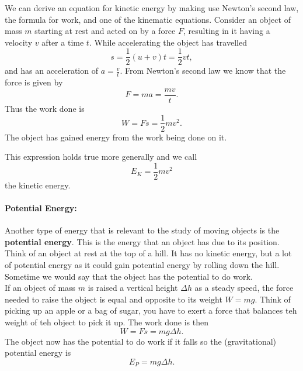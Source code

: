 \documentclass[a4paper,12pt]{book}
\begin{document}
We can derive an equation for kinetic energy by making use Newton's second law, the formula for work, and one of the kinematic equations. Consider an object of mass $m$ starting at rest and acted on by a force $F$, resulting in it having a velocity $v$ after a time $t$. While accelerating the object has travelled
\begin{equation*}
s=\frac{1}{2}\left(u+v\right)t=\frac{1}{2}vt,
\end{equation*}
and has an acceleration of $a=\frac{v}{t}$. From Newton's second law we know that the force is given by
\begin{equation*}
F=ma=\frac{mv}{t}.
\end{equation*}
Thus the work done is
\begin{equation*}
W=Fs=\frac{1}{2}mv^{2}.
\end{equation*}
The object has gained energy from the work being done on it.

This expression holds true more generally and we call 
\begin{equation}
E_{K}=\frac{1}{2}mv^{2}
\label{eq: kinetic energy}
\end{equation}
the kinetic energy.

%
\paragraph{Potential Energy:}  Another type of energy that is relevant to the study of moving objects is the \textbf{potential energy}. This is the energy that an object has due to its position. Think of an object at rest at the top of a hill. It has no kinetic energy, but a lot of potential energy as it could gain potential energy by rolling down the hill. Sometime we would say that the object has the potential to do work.\\

If an object of mass $m$ is raised a vertical height $\Delta h$ as a steady speed, the force needed to raise the object is equal and opposite to its weight $W=mg$. Think of picking up an apple or a bag of sugar, you have to exert a force that balances teh weight of teh object to pick it up. The work done is then
\begin{equation*}
W=Fs=mg\Delta h.
\end{equation*}
The object now has the potential to do work if it falls so the (gravitational) potential energy is 
\begin{equation}
E_{P}=mg\Delta h.
\label{eq: potential energy}
\end{equation}
\end{document}

